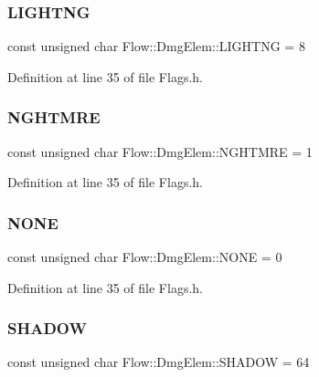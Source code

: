 \subsubsection{\texorpdfstring{L\+I\+G\+H\+T\+NG}{LIGHTNG}}
{\footnotesize\ttfamily const unsigned char Flow\+::\+Dmg\+Elem\+::\+L\+I\+G\+H\+T\+NG = 8}



Definition at line 35 of file Flags.\+h.

\hypertarget{namespace_flow_1_1_dmg_elem_ab1e9e2aae5dd0691b09de8ade59d3984}{}\label{namespace_flow_1_1_dmg_elem_ab1e9e2aae5dd0691b09de8ade59d3984} 
\subsubsection{\texorpdfstring{N\+G\+H\+T\+M\+RE}{NGHTMRE}}
{\footnotesize\ttfamily const unsigned char Flow\+::\+Dmg\+Elem\+::\+N\+G\+H\+T\+M\+RE = 1}



Definition at line 35 of file Flags.\+h.

\hypertarget{namespace_flow_1_1_dmg_elem_a2c7180f371963927ddcc5b333568a33b}{}\label{namespace_flow_1_1_dmg_elem_a2c7180f371963927ddcc5b333568a33b} 
\subsubsection{\texorpdfstring{N\+O\+NE}{NONE}}
{\footnotesize\ttfamily const unsigned char Flow\+::\+Dmg\+Elem\+::\+N\+O\+NE = 0}



Definition at line 35 of file Flags.\+h.

\hypertarget{namespace_flow_1_1_dmg_elem_a97d51ad54a8dceed5f5f3e0e856453e1}{}\label{namespace_flow_1_1_dmg_elem_a97d51ad54a8dceed5f5f3e0e856453e1} 
\subsubsection{\texorpdfstring{S\+H\+A\+D\+OW}{SHADOW}}
{\footnotesize\ttfamily const unsigned char Flow\+::\+Dmg\+Elem\+::\+S\+H\+A\+D\+OW = 64}



